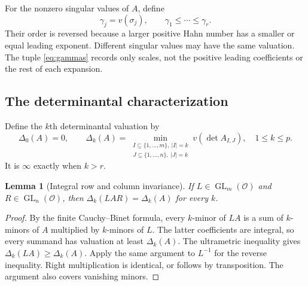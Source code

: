 \documentclass[11pt,a4paper]{article}
\numberwithin{equation}{section}
\newtheorem{lemma}[lemma]{Lemma}
\theoremstyle{definition}
\theoremstyle{remark}
\newcommand{\OO}{\mathcal O}
\newcommand{\GL}{\operatorname{GL}}
\begin{document}
For the nonzero singular values of $A$, define
\begin{equation}\label{eq:gammas}
 \gamma_j=v(\sigma_j),\qquad
 \gamma_1\le\cdots\le\gamma_r.
\end{equation}
Their order is reversed because a larger positive Hahn number has a smaller
or equal leading exponent. Different singular values may have the same
valuation. The tuple \eqref{eq:gammas} records only scales, not the positive
leading coefficients or the rest of each expansion.

\subsection{The determinantal characterization}
Define the $k$th determinantal valuation by
\begin{equation}\label{eq:Delta}
 \Delta_0(A)=0,\qquad
 \Delta_k(A)=\min_{\substack{I\subseteq\{1,\ldots,m\},\ |I|=k\\
                            J\subseteq\{1,\ldots,n\},\ |J|=k}}
            v(\det A_{I,J}),\quad 1\le k\le p.
\end{equation}
It is $\infty$ exactly when $k>r$.

\begin{lemma}[Integral row and column invariance]\label{lem:DeltaInvariant}
If $L\in\GL_m(\OO)$ and $R\in\GL_n(\OO)$, then
$\Delta_k(LAR)=\Delta_k(A)$ for every $k$.
\end{lemma}
\begin{proof}
By the finite Cauchy--Binet formula, every $k$-minor of $LA$ is a sum of
$k$-minors of $A$ multiplied by $k$-minors of $L$. The latter coefficients
are integral, so every summand has valuation at least $\Delta_k(A)$.
The ultrametric inequality gives $\Delta_k(LA)\ge\Delta_k(A)$. Apply the
same argument to $L^{-1}$ for the reverse inequality. Right multiplication
is identical, or follows by transposition. The argument also covers
vanishing minors.
\end{proof}
\end{document}
